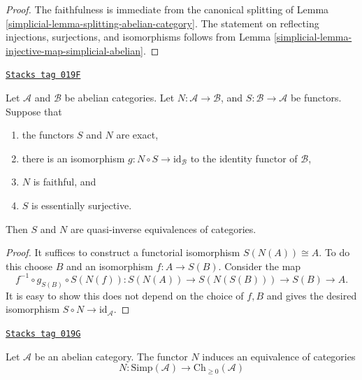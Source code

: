 \begin{proof}

The faithfulness is immediate from the canonical
splitting of Lemma \ref{simplicial-lemma-splitting-abelian-category}.
The statement on reflecting injections, surjections, and
isomorphisms follows from
Lemma \ref{simplicial-lemma-injective-map-simplicial-abelian}.
\end{proof}

\begin{lemma}[S N]
\label{simplicial-lemma-S-N}
\href{https://stacks.math.columbia.edu/tag/019F}{\texttt{Stacks tag 019F}}

Let $\mathcal{A}$ and $\mathcal{B}$ be abelian categories.
Let $N : \mathcal{A} \to \mathcal{B}$, and
$S : \mathcal{B} \to \mathcal{A}$ be functors.
Suppose that
\begin{enumerate}
\item the functors $S$ and $N$ are exact,
\item there is an isomorphism $g : N \circ S \to \text{id}_\mathcal{B}$
to the identity functor of $\mathcal{B}$,
\item $N$ is faithful, and
\item $S$ is essentially surjective.
\end{enumerate}
Then $S$ and $N$ are quasi-inverse equivalences of categories.
\end{lemma}

\begin{proof}
It suffices to construct a functorial
isomorphism $S(N(A)) \cong A$. To do this
choose $B$ and an isomorphism $f : A  \to S(B)$.
Consider the map
$$
f^{-1} \circ g_{S(B)} \circ S(N(f)) :
S(N(A)) \to S(N(S(B))) \to S(B) \to A.
$$
It is easy to show this does not depend on
the choice of $f, B$ and gives the desired
isomorphism $S \circ N \to \text{id}_\mathcal{A}$.
\end{proof}

\begin{theorem}
\label{simplicial-theorem-dold-kan}
\href{https://stacks.math.columbia.edu/tag/019G}{\texttt{Stacks tag 019G}}

Let $\mathcal{A}$ be an abelian category.
The functor $N$ induces an equivalence of
categories
$$
N :
\text{Simp}(\mathcal{A})
\longrightarrow
\text{Ch}_{\geq 0}(\mathcal{A})
$$
\end{theorem}

